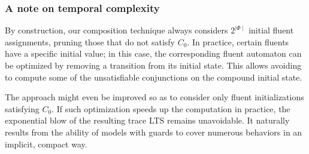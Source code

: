 \subsubsection*{A note on temporal complexity}

By construction, our composition technique always considers $2^{\mid\Phi\mid}$ initial fluent assignments, pruning those that do not satisfy $C_0$. In practice, certain fluents have a specific initial value; in this case, the corresponding fluent automaton can be optimized by removing a transition from its initial state. This allows avoiding to compute some of the unsatisfiable conjunctions on the compound initial state. 

The approach might even be improved so as to consider only fluent initializations satisfying $C_0$. If such optimization speeds up the computation in practice, the exponential blow of the resulting trace LTS remains unavoidable. It naturally results from the ability of models with guards to cover numerous behaviors in an implicit, compact way.
